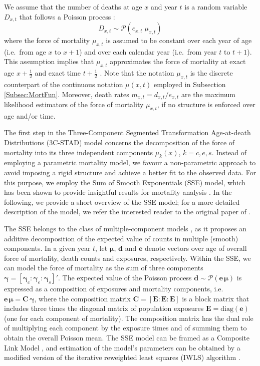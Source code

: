 \documentclass[11pt, a4paper]{article}
\begin{document}
We assume that the number of deaths at age $x$ and year $t$ is a random variable $D_{x,t}$ that follows a Poisson process \citep{brillinger1986biometrics}:
\begin{equation}\label{Eq:Poisson}
D_{x,t} \sim \mathcal{P}(e_{x,t} \; \mu_{x,t}) 
\end{equation}
where the force of mortality $\mu_{x,t}$ is assumed to be constant over each year of age (i.e.~from age $x$ to $x+1$) and over each calendar year (i.e.~from year $t$ to $t+1$). This assumption implies that $\mu_{x,t}$ approximates the force of mortality at exact age $x+\frac{1}{2}$ and exact time $t+\frac{1}{2}$ \citep{cairns2009quantitative}. Note that the notation $\mu_{x,t}$ is the discrete counterpart of the continuous notation $\mu(x,t)$ employed in Subsection \ref{Subsec:MortFun}. Moreover, death rates $m_{x,t} = d_{x,t}/e_{x,t}$ are the maximum likelihood estimators of the force of mortality $\mu_{x,t}$, if no structure is enforced over age and/or time. 
 
The first step in the Three-Component Segmented Transformation Age-at-death Distributions (3C-STAD) model concerns the decomposition of the force of mortality into its three independent components $\mu_k(x)$, $k=c,e,s$. Instead of employing a parametric mortality model, we favour a non-parametric approach to avoid imposing a rigid structure and achieve a better fit to the observed data. For this purpose, we employ the Sum of Smooth Exponentials (SSE) model, which has been shown to provide insightful results for mortality analysis \citep{camarda2016sums,remund2018young}. In the following, we provide a short overview of the SSE model; for a more detailed description of the model, we refer the interested reader to the original paper of \cite{camarda2016sums}.

The SSE belongs to the class of multiple-component models \cite[also known as competing hazard models,][]{gage1993decline}, as it proposes an additive decomposition of the expected value of counts in multiple (smooth) components. In a given year $t$, let $\bm{\mu}$, $\bm{d}$ and $\bm{e}$ denote vectors over age of overall force of mortality, death counts and exposures, respectively. Within the SSE, we can model the force of mortality as the sum of three components $\bm{\gamma}=\left[\bm{\gamma}_c:\bm{\gamma}_e:\bm{\gamma}_s\right]'$. The expected value of the Poisson process $\bm{d} \sim \mathcal{P}(\bm{e}\,\bm{\mu})$ is expressed as a composition of exposures and mortality components, i.e.~$\bm{e}\,\bm{\mu} = \bm{C}\,\bm{\gamma}$, where the composition matrix $\bm{C}=\left[\bm{E}:\bm{E}:\bm{E}\right]$ is a block matrix that includes three times the diagonal matrix of population exposures $\bm{E}=\mathrm{diag}(\bm{e})$ (one for each component of mortality). The composition matrix has the dual role of multiplying each component by the exposure times and of summing them to obtain the overall Poisson mean. The SSE model can be framed as a Composite Link Model \citep{thompson1981composite}, and estimation of the model's parameters can be obtained by a modified version of the iterative reweighted least squares (IWLS) algorithm \citep{eilers2007ill}.  
\end{document}
